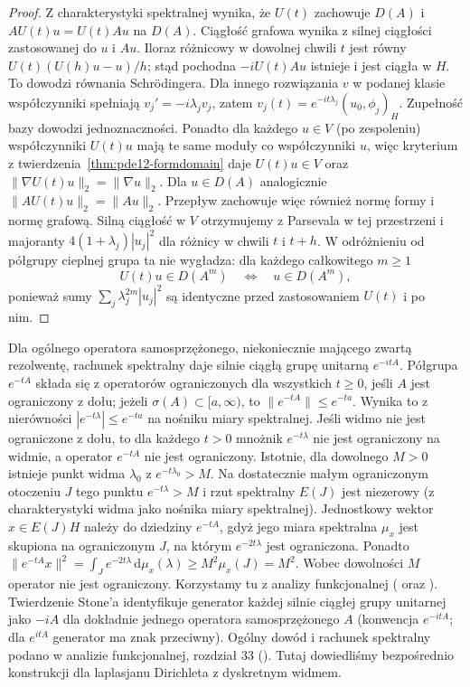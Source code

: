 \begin{proof}
Z charakterystyki spektralnej wynika, że $U(t)$ zachowuje
$D(A)$ i $AU(t)u=U(t)Au$ na $D(A)$.
Ciągłość grafowa wynika z silnej ciągłości zastosowanej
do $u$ i $Au$. Iloraz różnicowy w dowolnej chwili $t$
jest równy $U(t)(U(h)u-u)/h$; stąd pochodna
$-iU(t)Au$ istnieje i jest ciągła w $H$.
To dowodzi równania Schrödingera. Dla innego rozwiązania
$v$ w podanej klasie współczynniki spełniają
$v_j'=-i\lambda_jv_j$, zatem
$v_j(t)=e^{-it\lambda_j}(u_0,\phi_j)_H$.
Zupełność bazy dowodzi jednoznaczności.
Ponadto dla każdego $u\in V$ (po zespoleniu)
współczynniki $U(t)u$ mają te same moduły co współczynniki
$u$, więc kryterium z twierdzenia~\ref{thm:pde12-formdomain}
daje $U(t)u\in V$ oraz $\|\nabla U(t)u\|_2=\|\nabla u\|_2$.
Dla $u\in D(A)$ analogicznie
$\|AU(t)u\|_2=\|Au\|_2$. Przepływ zachowuje więc również
normę formy i normę grafową. Silną ciągłość w $V$
otrzymujemy z Parsevala w tej przestrzeni i majoranty
$4(1+\lambda_j)|u_j|^2$ dla różnicy w chwili $t$ i $t+h$.
W odróżnieniu od półgrupy cieplnej grupa ta nie wygładza:
dla każdego całkowitego $m\ge1$
\[
 U(t)u\in D(A^m)\quad\Longleftrightarrow\quad u\in D(A^m),
\]
ponieważ sumy $\sum_j\lambda_j^{2m}|u_j|^2$ są identyczne
przed zastosowaniem $U(t)$ i po nim.
\end{proof}

\begin{uwaga}
Dla ogólnego operatora samosprzężonego, niekoniecznie
mającego zwartą rezolwentę, rachunek spektralny daje
silnie ciągłą grupę unitarną $e^{-itA}$.
Półgrupa $e^{-tA}$ składa się z operatorów ograniczonych
dla wszystkich $t\ge0$, jeśli $A$ jest ograniczony z dołu;
jeżeli $\sigma(A)\subset[a,\infty)$, to
$\|e^{-tA}\|\le e^{-ta}$. Wynika to z nierówności
$|e^{-t\lambda}|\le e^{-ta}$ na nośniku miary spektralnej.
Jeśli widmo nie jest ograniczone z dołu, to dla każdego
$t>0$ mnożnik $e^{-t\lambda}$ nie jest ograniczony na
widmie, a operator $e^{-tA}$ nie jest ograniczony.
Istotnie, dla dowolnego $M>0$ istnieje punkt widma
$\lambda_0$ z $e^{-t\lambda_0}>M$. Na dostatecznie
małym ograniczonym otoczeniu $J$ tego punktu
$e^{-t\lambda}>M$ i rzut spektralny $E(J)$ jest niezerowy
(z charakterystyki widma jako nośnika miary spektralnej).
Jednostkowy wektor $x\in E(J)H$ należy do dziedziny
$e^{-tA}$, gdyż jego miara spektralna $\mu_x$
jest skupiona na ograniczonym $J$, na którym
$e^{-2t\lambda}$ jest ograniczona. Ponadto
$\|e^{-tA}x\|^2=\int_J e^{-2t\lambda}\,\mathrm d\mu_x(\lambda)
\ge M^2\mu_x(J)=M^2$.
Wobec dowolności $M$ operator nie jest ograniczony.
Korzystamy tu z analizy funkcjonalnej
( oraz
).
Twierdzenie Stone'a identyfikuje generator każdej silnie
ciągłej grupy unitarnej jako $-iA$ dla dokładnie jednego
operatora samosprzężonego $A$ (konwencja $e^{-itA}$;
dla $e^{itA}$ generator ma znak przeciwny).
Ogólny dowód i rachunek spektralny podano w analizie
funkcjonalnej, rozdział 33
().
Tutaj dowiedliśmy bezpośrednio konstrukcji dla laplasjanu
Dirichleta z dyskretnym widmem.
\end{uwaga}

